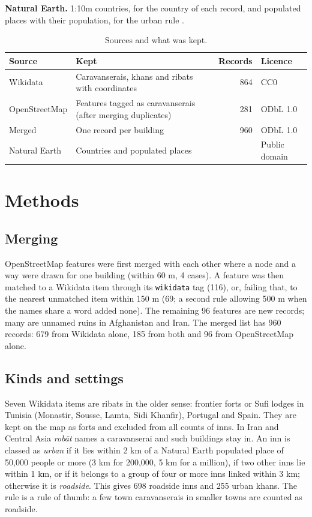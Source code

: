 \documentclass[11pt,a4paper]{article}
\begin{document}
\textbf{Natural Earth.} 1:10m countries, for the country of each record, and populated places with their population, for the urban rule \citep{naturalearth}.

\begin{table}[tbp]\centering\small\caption{Sources and what was kept.}\label{tab:sources}\begin{tabular}{>{\raggedright\arraybackslash}p{3.2cm}>{\raggedright\arraybackslash}p{6.4cm}r>{\raggedright\arraybackslash}p{2.2cm}}\toprule Source & Kept & Records & Licence\\\midrule
Wikidata & Caravanserais, khans and ribats with coordinates & 864 & CC0\\
OpenStreetMap & Features tagged as caravanserais (after merging duplicates) & 281 & ODbL 1.0\\
Merged & One record per building & 960 & ODbL 1.0\\
Natural Earth & Countries and populated places & & Public domain\\
\bottomrule\end{tabular}\end{table}

\section{Methods}
\subsection{Merging}
OpenStreetMap features were first merged with each other where a node and a way were drawn for one building (within 60 m, 4 cases). A feature was then matched to a Wikidata item through its \texttt{wikidata} tag (116), or, failing that, to the nearest unmatched item within 150 m (69; a second rule allowing 500 m when the names share a word added none). The remaining 96 features are new records; many are unnamed ruins in Afghanistan and Iran. The merged list has 960 records: 679 from Wikidata alone, 185 from both and 96 from OpenStreetMap alone.

\subsection{Kinds and settings}
Seven Wikidata items are ribats in the older sense: frontier forts or Sufi lodges in Tunisia (Monastir, Sousse, Lamta, Sidi Khanfir), Portugal and Spain. They are kept on the map as forts and excluded from all counts of inns. In Iran and Central Asia \emph{rob\=at} names a caravanserai and such buildings stay in. An inn is classed as \emph{urban} if it lies within 2 km of a Natural Earth populated place of 50,000 people or more (3 km for 200,000, 5 km for a million), if two other inns lie within 1 km, or if it belongs to a group of four or more inns linked within 3 km; otherwise it is \emph{roadside}. This gives 698 roadside inns and 255 urban khans. The rule is a rule of thumb: a few town caravanserais in smaller towns are counted as roadside.
\end{document}

